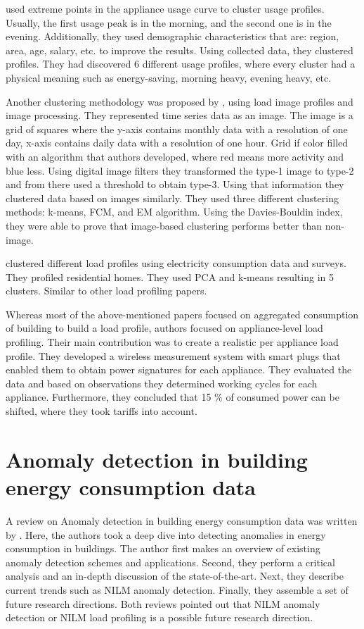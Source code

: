 \documentclass[
11pt, %
english, %
singlespacing, %
headsepline, %
]{MastersDoctoralThesis} %
\begin{document}
\cite{Jeong2021} used extreme points in the appliance usage curve to cluster usage profiles.
Usually, the first usage peak is in the morning, and the second one is in the evening. 
Additionally, they used demographic characteristics that are: region, area, age, salary, etc. to improve the results.
Using collected data, they clustered profiles. They had discovered 6 different usage profiles, 
where every cluster had a physical meaning such as energy-saving, morning heavy, evening heavy, etc.

Another clustering methodology was proposed by \cite{Park2019}, using load image profiles and image processing.
They represented time series data as an image. The image is a grid of squares where the y-axis contains monthly data with a resolution of one day,
x-axis contains daily data with a resolution of one hour. Grid if color filled with an algorithm that authors developed,
where red means more activity and blue less. Using digital image filters they transformed the type-1 image to type-2 and from there
used a threshold to obtain type-3. Using that information they clustered data based on images similarly. They used three different 
clustering methods: k-means, FCM, and EM algorithm. Using the Davies-Bouldin index, they were able to prove that image-based clustering performs better than non-image.

\cite{Joana2012} clustered different load profiles using electricity consumption data and surveys. They profiled residential homes. 
They used PCA and k-means resulting in 5 clusters. Similar to other load profiling papers. 

Whereas most of the above-mentioned papers focused on aggregated consumption of building to build a load profile,
authors \cite{Issi2018} focused on appliance-level load profiling.
Their main contribution was to create a realistic per appliance load profile.
They developed a wireless measurement system with smart plugs that enabled them to obtain 
power signatures for each appliance. They evaluated the data and based on observations they determined working cycles for each appliance.
Furthermore, they concluded that 15 \% of consumed power can be shifted, where they took tariffs into account. 

\section{Anomaly detection in building energy consumption data}

A review on Anomaly detection in building energy consumption data was written by \cite{HIMEUR2021116601}.
Here, the authors took a deep dive into detecting anomalies in energy consumption in buildings. 
The author first makes an overview of existing anomaly detection schemes and applications.
Second, they perform a critical analysis and an in-depth discussion of the state-of-the-art.
Next, they describe current trends such as NILM anomaly detection. Finally, they assemble a set of future research directions. 
Both reviews pointed out that NILM anomaly detection or NILM load profiling is a possible future research direction.
\end{document}
